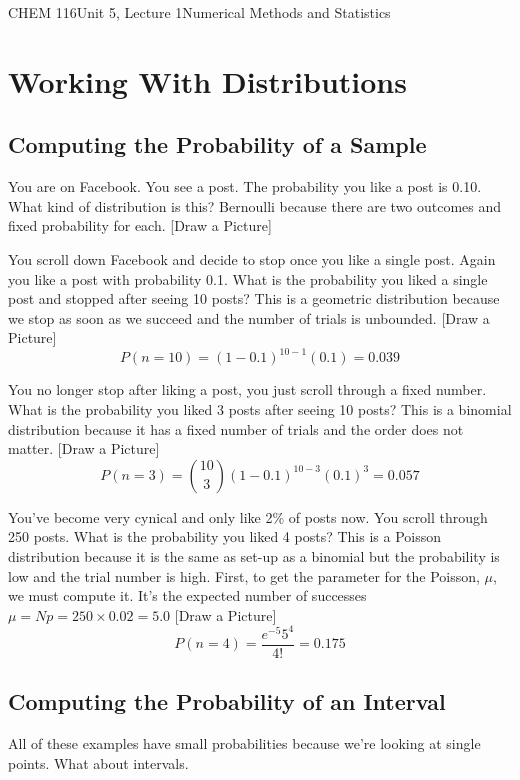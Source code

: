 \documentclass{article}
\begin{document}
\begin{tdoc}{CHEM 116}{Unit 5, Lecture 1}{Numerical Methods and Statistics}

\section{Working With Distributions}

\subsection{Computing the Probability of a Sample}

You are on Facebook. You see a post. The probability you like a post
is 0.10. What kind of distribution is this? Bernoulli because there
are two outcomes and fixed probability for each. [Draw a Picture]

You scroll down Facebook and decide to stop once you like a single
post. Again you like a post with probability 0.1. What is the
probability you liked a single post and stopped after seeing 10
posts? This is a geometric distribution because we stop as soon as we
succeed and the number of trials is unbounded. [Draw a Picture]
\[
P(n=10) = (1 - 0.1)^{10 - 1}(0.1) = 0.039
\]

You no longer stop after liking a post, you just scroll through a
fixed number. What is the probability you liked 3 posts after seeing
10 posts? This is a binomial distribution because it has a fixed
number of trials and the order does not matter. [Draw a Picture]
\[
P(n=3) = {10 \choose 3} (1 - 0.1)^{10 -3 }(0.1)^{3} = 0.057
\]

You've become very cynical and only like 2\% of posts now. You scroll
through 250 posts. What is the probability you liked 4 posts? This is
a Poisson distribution because it is the same as set-up as a binomial
but the probability is low and the trial number is high. First, to
get the parameter for the Poisson, $\mu$, we must compute it. It's
the expected number of successes $\mu = Np = 250 \times 0.02 = 5.0$
[Draw a Picture]
\[
P(n=4) = \frac{e^{-5}5^4}{4!} = 0.175
\]

 \subsection{Computing the Probability of an Interval}

 All of these examples have small probabilities because we're looking
 at single points. What about intervals.


\end{tdoc}
\end{document}
